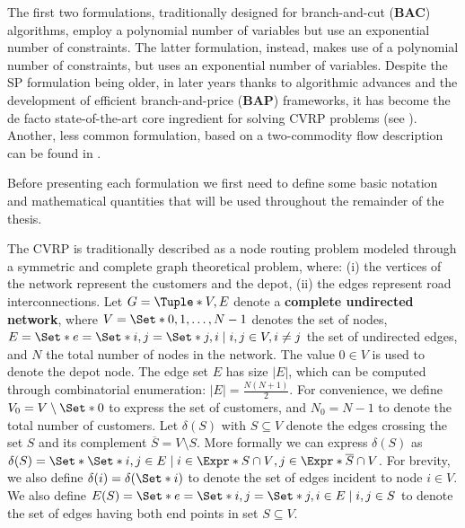 The first two formulations, traditionally designed
for branch-and-cut (\textbf{BAC}) algorithms, employ a polynomial number of variables
but use an exponential number of constraints.
The latter formulation, instead, makes use of a polynomial number of constraints,
but uses an exponential number of variables.
Despite the SP formulation being older, in later years thanks to algorithmic advances
and the development of efficient branch-and-price (\textbf{BAP}) frameworks, it has become the de facto
state-of-the-art core ingredient for solving CVRP problems (see \cite{pessoa2020}).
Another, less common formulation, based on a two-commodity flow description
can be found in \textcite{baldacci2004}.


\medskip
Before presenting each formulation we first need to define some basic notation
and mathematical quantities that will be used throughout the remainder of the thesis.

The CVRP is traditionally described as a node routing problem modeled through a symmetric and complete graph theoretical problem,
where: (i) the vertices of the network represent the customers and the depot,
(ii) the edges represent road interconnections.
Let $G = \Tuple*{V, E}$ denote a \textbf{complete undirected network}, where $V = \Set*{0, 1, \dots, N - 1}$ denotes the set of nodes,
$E = \Set*{e = \Set*{i, j} = \Set*{j, i} \mid \allowbreak i,j \in V, \allowbreak i \ne j}$ the set of undirected edges,
and $N$ the total number of nodes in the network.
The value $0 \in V$ is used to denote the depot node.
The edge set $E$ has size $|E|$, which can be computed through combinatorial enumeration: $|E| = \frac{N (N+1)}{2}$.
For convenience, we define $V_0 = V \setminus \Set*{0}$ to express the set of customers,
and $N_0 = N - 1$ to denote the total number of customers.
Let $\delta(S)$ with $S \subseteq V$ denote the edges crossing the set $S$ and its complement $\overline{S} = V \setminus S$.
More formally we can express $\delta(S)$ as $\delta(S) = \Set*{ \Set*{i, j} \in E \mid i \in \Expr*{S \cap V}, j \in \Expr*{ \overline{S} \cap V } }$.
For brevity, we also define $\delta(i) = \delta(\Set*{i})$ to denote the set of edges incident to node $i \in V$.
We also define $E(S) = \Set*{e = \Set*{i, j} = \Set*{j, i}\in E \mid i, j \in S}$ to denote the set of edges having both end points in set $S \subseteq V$.

